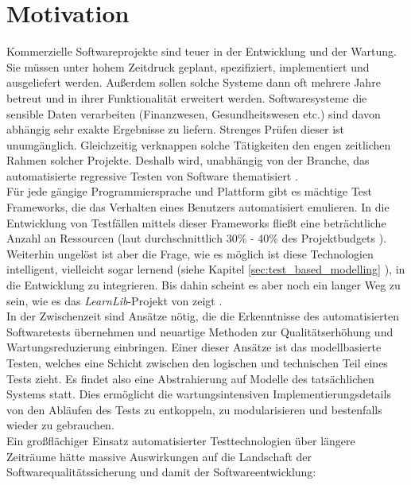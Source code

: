 \section{Motivation}
Kommerzielle Softwareprojekte sind teuer in der Entwicklung und der Wartung. Sie müssen unter hohem Zeitdruck geplant, spezifiziert, implementiert und ausgeliefert werden. Außerdem sollen solche Systeme dann oft mehrere Jahre betreut und in ihrer Funktionalität erweitert werden. Softwaresysteme die sensible Daten verarbeiten (Finanzwesen, Gesundheitswesen etc.) sind davon abhängig sehr exakte Ergebnisse zu liefern. Strenges Prüfen dieser ist unumgänglich. Gleichzeitig verknappen solche Tätigkeiten den engen zeitlichen Rahmen solcher Projekte. Deshalb wird, unabhängig von der Branche, das automatisierte regressive Testen von Software thematisiert \cite{graham_experiences_2012}.\\
Für jede gängige Programmiersprache und Plattform gibt es mächtige Test \Glspl{Framework}, die das Verhalten eines Benutzers automatisiert emulieren. In die Entwicklung von Testfällen mittels dieser \Glspl{Framework} fließt eine beträchtliche Anzahl an Ressourcen (laut \citeauthor{pol_management_2002} durchschnittlich 30\% - 40\% des Projektbudgets \cite{pol_management_2002}). Weiterhin ungelöst ist aber die Frage, wie es möglich ist diese Technologien intelligent, vielleicht sogar lernend (siehe Kapitel \ref{sec:test_based_modelling} ), in die Entwicklung zu integrieren. Bis dahin scheint es aber noch ein langer Weg zu sein, wie es das \textit{LearnLib}-Projekt von \citeauthor{steffen_introduction_2011} zeigt \cite{steffen_introduction_2011}.\\

In der Zwischenzeit sind Ansätze nötig, die die Erkenntnisse des automatisierten Softwaretests übernehmen und neuartige Methoden zur Qualitätserhöhung und Wartungsreduzierung einbringen. Einer dieser Ansätze ist das modellbasierte Testen, welches eine Schicht zwischen den logischen und technischen Teil eines Tests zieht. Es findet also eine Abstrahierung auf Modelle des tatsächlichen Systems statt. Dies ermöglicht die wartungsintensiven Implementierungsdetails von den Abläufen des Tests zu entkoppeln, zu modularisieren und bestenfalls wieder zu gebrauchen.\\
Ein großflächiger Einsatz automatisierter Testtechnologien über längere Zeiträume hätte massive Auswirkungen auf die Landschaft der Softwarequalitätssicherung und damit der Softwareentwicklung:

